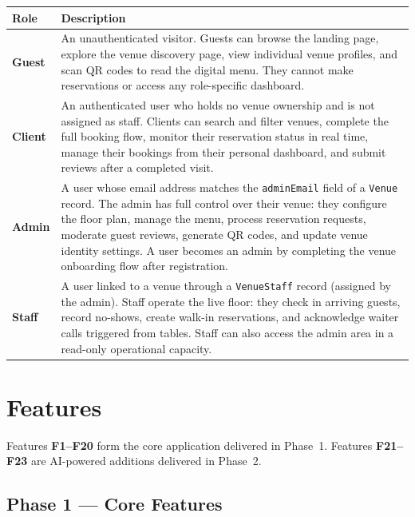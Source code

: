 \documentclass[12pt,a4paper]{article}
\begin{document}
\vspace{0.5em}
\begin{tabularx}{\linewidth}{>{\bfseries}lX}
    \toprule
    Role & Description \\
    \midrule
    Guest &
        An unauthenticated visitor. Guests can browse the landing page,
        explore the venue discovery page, view individual venue profiles,
        and scan QR codes to read the digital menu. They cannot make
        reservations or access any role-specific dashboard. \\
    \addlinespace
    Client &
        An authenticated user who holds no venue ownership and is not
        assigned as staff. Clients can search and filter venues, complete
        the full booking flow, monitor their reservation status in real
        time, manage their bookings from their personal dashboard, and
        submit reviews after a completed visit. \\
    \addlinespace
    Admin &
        A user whose email address matches the \texttt{adminEmail} field
        of a \texttt{Venue} record. The admin has full control over their
        venue: they configure the floor plan, manage the menu, process
        reservation requests, moderate guest reviews, generate QR codes,
        and update venue identity settings. A user becomes an admin by
        completing the venue onboarding flow after registration. \\
    \addlinespace
    Staff &
        A user linked to a venue through a \texttt{VenueStaff} record
        (assigned by the admin). Staff operate the live floor: they check
        in arriving guests, record no-shows, create walk-in reservations,
        and acknowledge waiter calls triggered from tables. Staff can also
        access the admin area in a read-only operational capacity. \\
    \bottomrule
\end{tabularx}

\section{Features}

Features \textbf{F1--F20} form the core application delivered in Phase~1.
Features \textbf{F21--F23} are AI-powered additions delivered in Phase~2.

\subsection{Phase 1 --- Core Features}
\end{document}
